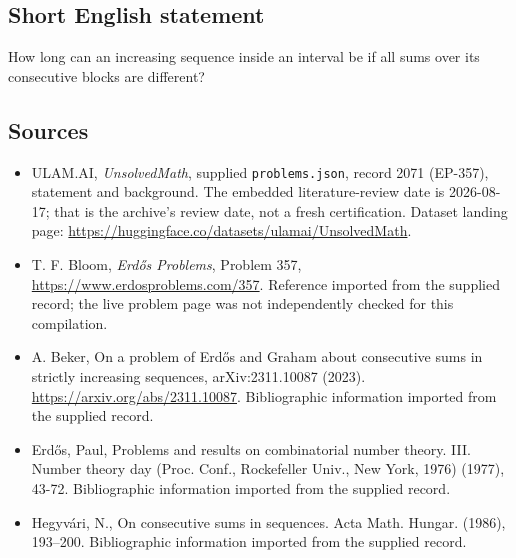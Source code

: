 \documentclass[11pt,a4paper]{article}
\begin{document}
\subsection{Short English statement}

How long can an increasing sequence inside an interval be if all sums over its consecutive blocks are different?

\subsection{Sources}

{\small

\begin{itemize}

\item[\hypertarget{source:2071:1}{S1}] ULAM.AI, \emph{UnsolvedMath}, supplied \texttt{problems.json}, record 2071 (EP-357), statement and background. The embedded literature-review date is 2026-08-17; that is the archive’s review date, not a fresh certification. Dataset landing page: \url{https://huggingface.co/datasets/ulamai/UnsolvedMath}.

\item[\hypertarget{source:2071:2}{S2}] T. F. Bloom, \emph{Erdős Problems}, Problem 357, \url{https://www.erdosproblems.com/357}. Reference imported from the supplied record; the live problem page was not independently checked for this compilation.

\item[\hypertarget{source:2071:3}{S3}] A. Beker, On a problem of Erdős and Graham about consecutive sums in strictly increasing sequences, arXiv:2311.10087 (2023). \url{https://arxiv.org/abs/2311.10087}. Bibliographic information imported from the supplied record.

\item[\hypertarget{source:2071:4}{S4}] Erd\H{o}s, Paul, Problems and results on combinatorial number theory. III. Number theory day (Proc. Conf., Rockefeller Univ., New York, 1976) (1977), 43-72. Bibliographic information imported from the supplied record.

\item[\hypertarget{source:2071:5}{S5}] Hegyv\'ari, N., On consecutive sums in sequences. Acta Math. Hungar. (1986), 193--200. Bibliographic information imported from the supplied record.

\end{itemize}

}

\label{end:2071}
\end{document}
